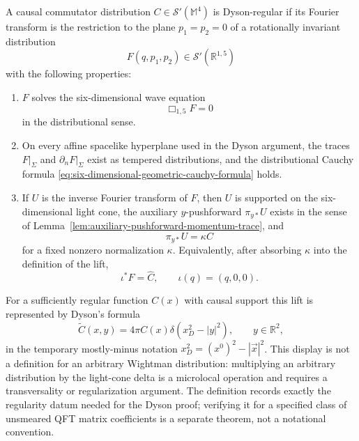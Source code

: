 \begin{definition}
\label{def:dyson-regular-causal-commutator}
A causal commutator distribution \(C\in\mathcal S'(\mathbb M^4)\) is
Dyson-regular if its Fourier transform is the restriction to the plane
\(p_1=p_2=0\) of a rotationally invariant distribution
\[
  F(q,p_1,p_2)\in\mathcal S'(\mathbb R^{1,5})
\]
with the following properties:
\begin{enumerate}
  \item \(F\) solves the six-dimensional wave equation
  \[
    \Box_{1,5}F=0
  \]
  in the distributional sense.
  \item On every affine spacelike hyperplane used in the Dyson argument, the
  traces \(F|_\Sigma\) and \(\partial_nF|_\Sigma\) exist as tempered
  distributions, and the distributional Cauchy formula
  \eqref{eq:six-dimensional-geometric-cauchy-formula} holds.
  \item If \(U\) is the inverse Fourier transform of \(F\), then
  \(U\) is supported on the six-dimensional light cone, the auxiliary
  \(y\)-pushforward \(\pi_{y*}U\) exists in the sense of
  Lemma~\ref{lem:auxiliary-pushforward-momentum-trace}, and
  \[
    \pi_{y*}U=\kappa C
  \]
  for a fixed nonzero normalization \(\kappa\).  Equivalently, after
  absorbing \(\kappa\) into the definition of the lift,
  \[
    \iota^*F=\widehat C,
    \qquad
    \iota(q)=(q,0,0).
  \]
\end{enumerate}
For a sufficiently regular function \(C(x)\) with causal support this lift is
represented by Dyson's formula
\[
  \widetilde C(x,y)=4\pi C(x)\delta(x_D^2-|y|^2),
  \qquad y\in\mathbb R^2,
\]
in the temporary mostly-minus notation \(x_D^2=(x^0)^2-|\vec x|^2\).  This
display is not a definition for an arbitrary Wightman distribution: multiplying
an arbitrary distribution by the light-cone delta is a microlocal operation and
requires a transversality or regularization argument.  The definition records
exactly the regularity datum needed for the Dyson proof; verifying it for a
specified class of unsmeared QFT matrix coefficients is a separate theorem,
not a notational convention.
\end{definition}

